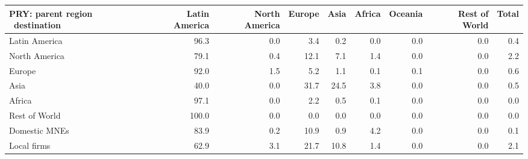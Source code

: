 \begin{tabular}{lrrrrrrrr}
\toprule
PRY: parent region \ destination & Latin America & North America & Europe & Asia & Africa & Oceania & Rest of World & Total \\
\midrule
Latin America & 96.3 & 0.0 & 3.4 & 0.2 & 0.0 & 0.0 & 0.0 & 0.4 \\
North America & 79.1 & 0.4 & 12.1 & 7.1 & 1.4 & 0.0 & 0.0 & 2.2 \\
Europe & 92.0 & 1.5 & 5.2 & 1.1 & 0.1 & 0.1 & 0.0 & 0.6 \\
Asia & 40.0 & 0.0 & 31.7 & 24.5 & 3.8 & 0.0 & 0.0 & 0.5 \\
Africa & 97.1 & 0.0 & 2.2 & 0.5 & 0.1 & 0.0 & 0.0 & 0.0 \\
Rest of World & 100.0 & 0.0 & 0.0 & 0.0 & 0.0 & 0.0 & 0.0 & 0.0 \\
Domestic MNEs & 83.9 & 0.2 & 10.9 & 0.9 & 4.2 & 0.0 & 0.0 & 0.1 \\
Local firms & 62.9 & 3.1 & 21.7 & 10.8 & 1.4 & 0.0 & 0.0 & 2.1 \\
\bottomrule
\end{tabular}
